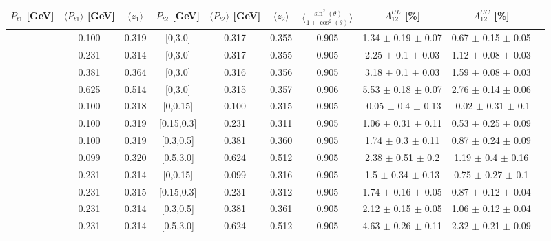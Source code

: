 \begin{table}[H]\tiny
\centering
\renewcommand{\arraystretch}{1.5}
\begin{tabular}{|c| c| c| c| c| c| c| c| c| c|}
\hline
$P_{t1}$  [GeV]  & $\langle  P_{t1} \rangle$  [GeV]  & $\langle  z_{1}  \rangle$ & $P_{t2}$  [GeV] &  $\langle  P_{t2}\rangle$  [GeV]  & $\langle  z_{2}\rangle$ &$\langle\frac{\sin^2(\theta)}{1+\cos^2(\theta)}\rangle$ &$A_{12}^{UL}$ [\%] &  $A_{12}^{UC}$ [\%]   \\ \hline
[0,0.15]	&	0.100	&	0.319	&	[0,3.0]	&	0.317	&	0.355	&	0.905	& 1.34  $\pm$ 0.19  $\pm$ 0.07 & 0.67  $\pm$ 0.15  $\pm$ 0.05 \\ \hline
[0.15,0.3]	&	0.231	&	0.314	&	[0,3.0]	&	0.317	&	0.355	&	0.905	& 2.25  $\pm$ 0.1  $\pm$ 0.03  & 1.12  $\pm$ 0.08  $\pm$ 0.03 \\ \hline
[0.3,0.5]	&	0.381	&	0.364	&	[0,3.0]	&	0.316	&	0.356	&	0.905	& 3.18  $\pm$ 0.1  $\pm$ 0.03  & 1.59  $\pm$ 0.08  $\pm$ 0.03 \\ \hline
[0.5,3.0]	&	0.625	&	0.514	&	[0,3.0]	&	0.315	&	0.357	&	0.906	& 5.53  $\pm$ 0.18  $\pm$ 0.07 & 2.76  $\pm$ 0.14  $\pm$ 0.06 \\ \hline
\hline
[0,0.15]	&	0.100	&	0.318	&	[0,0.15]	&	0.100	&	0.315	&	0.905	&-0.05  $\pm$ 0.4  $\pm$ 0.13  & -0.02  $\pm$ 0.31  $\pm$ 0.1 \\ \hline
[0,0.15]	&	0.100	&	0.319	&	[0.15,0.3]	&	0.231	&	0.311	&	0.905	&1.06  $\pm$ 0.31  $\pm$ 0.11  & 0.53  $\pm$ 0.25  $\pm$ 0.09 \\ \hline
[0,0.15]	&	0.100	&	0.319	&	[0.3,0.5]	&	0.381	&	0.360	&	0.905	&1.74  $\pm$ 0.3  $\pm$ 0.11   & 0.87  $\pm$ 0.24  $\pm$ 0.09 \\ \hline
[0,0.15]	&	0.099	&	0.320	&	[0.5,3.0]	&	0.624	&	0.512	&	0.905	&2.38  $\pm$ 0.51  $\pm$ 0.2   & 1.19  $\pm$ 0.4  $\pm$ 0.16  \\ \hline
\hline
[0.15,0.3]	&	0.231	&	0.314	&	[0,0.15]	&	0.099	&	0.316	&	0.905	&1.5  $\pm$ 0.34  $\pm$ 0.13   & 0.75  $\pm$ 0.27  $\pm$ 0.1  \\ \hline
[0.15,0.3]	&	0.231	&	0.315	&	[0.15,0.3]	&	0.231	&	0.312	&	0.905	&1.74  $\pm$ 0.16  $\pm$ 0.05  & 0.87  $\pm$ 0.12  $\pm$ 0.04 \\ \hline
[0.15,0.3]	&	0.231	&	0.314	&	[0.3,0.5]	&	0.381	&	0.361	&	0.905	&2.12  $\pm$ 0.15  $\pm$ 0.05  & 1.06  $\pm$ 0.12  $\pm$ 0.04 \\ \hline
[0.15,0.3]	&	0.231	&	0.314	&	[0.5,3.0]	&	0.624	&	0.512	&	0.905	&4.63  $\pm$ 0.26  $\pm$ 0.11  & 2.32  $\pm$ 0.21  $\pm$ 0.09 \\ \hline

\end{tabular}
\end{table}
